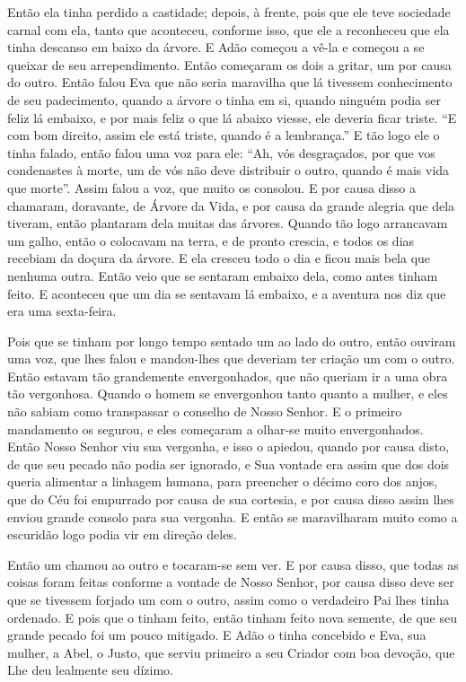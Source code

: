 Então ela tinha perdido a castidade; depois, à frente, pois que ele teve
sociedade carnal com ela, tanto que aconteceu, conforme isso, que ele a
reconheceu que ela tinha descanso em baixo da árvore. E Adão começou a vê-la e
começou a se queixar de seu arrependimento. Então começaram os dois a gritar,
um por causa do outro. Então falou Eva que não seria maravilha que lá tivessem
conhecimento de seu padecimento, quando a árvore o tinha em si, quando ninguém
podia ser feliz lá embaixo, e por mais feliz o que lá abaixo viesse, ele
deveria ficar triste. “E com bom direito, assim ele está triste, quando é a
lembrança.” E tão logo ele o tinha falado, então falou uma voz para ele: ``Ah,
vós desgraçados, por que vos condenastes à morte, um de vós não deve distribuir
o outro, quando é mais vida que morte”. Assim falou a voz, que muito os
consolou. E por causa disso a chamaram, doravante, de Árvore da Vida, e por
causa da grande alegria que dela tiveram, então plantaram dela muitas das
árvores. Quando tão logo arrancavam um galho, então o colocavam na terra, e de
pronto crescia, e todos os dias recebiam da doçura da árvore. E ela cresceu
todo o dia e ficou mais bela que nenhuma outra. Então veio que se sentaram
embaixo dela, como antes tinham feito. E aconteceu que um dia se sentavam lá
embaixo, e a aventura nos diz que era uma sexta-feira.

Pois que se tinham por longo tempo sentado um ao lado do outro, então ouviram
uma voz, que lhes falou e mandou-lhes que deveriam ter criação um com o outro.
Então estavam tão grandemente envergonhados, que não queriam ir a uma obra tão
vergonhosa. Quando o homem se envergonhou tanto quanto a mulher, e eles não
sabiam como transpassar o conselho de Nosso Senhor. E o primeiro mandamento os
segurou, e eles começaram a olhar-se muito envergonhados. Então Nosso Senhor
viu sua vergonha, e isso o apiedou, quando por causa disto, de que seu pecado
não podia ser ignorado, e Sua vontade era assim que dos dois queria alimentar a
linhagem humana, para preencher o décimo coro dos anjos, que do Céu foi
empurrado por causa de sua cortesia, e por causa disso assim lhes enviou grande
consolo para sua vergonha. E então se maravilharam muito como a escuridão logo
podia vir em direção deles. 

Então um chamou ao outro e tocaram-se sem ver. E por causa disso, que todas as
coisas foram feitas conforme a vontade de Nosso Senhor, por causa disso deve
ser que se tivessem forjado um com o outro, assim como o verdadeiro Pai lhes
tinha ordenado. E pois que o tinham feito, então tinham feito nova semente, de
que seu grande pecado foi um pouco mitigado. E Adão o tinha concebido e Eva,
sua mulher, a Abel, o Justo, que serviu primeiro a seu Criador com boa devoção,
que Lhe deu lealmente seu dízimo.

